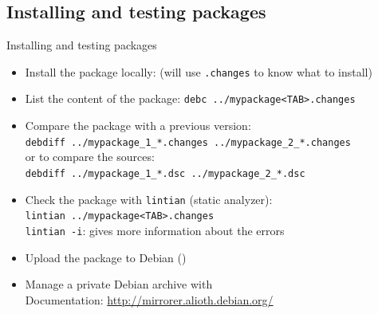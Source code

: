 \documentclass[10pt,final]{beamer}
\begin{document}
\subsection{Installing and testing packages}
\begin{frame}{Installing and testing packages}
\begin{itemize}
	\item Install the package locally:  (will use \texttt{.changes} to know what to install)
		\br
	\item List the content of the package: \texttt{{\color{rouge}debc} ../mypackage<TAB>.changes}
		\br
	\item Compare the package with a previous version:\\
		\texttt{{\color{rouge}debdiff} ../mypackage\_1\_*.changes ../mypackage\_2\_*.changes}\\
		or to compare the sources:\\
		\texttt{{\color{rouge}debdiff} ../mypackage\_1\_*.dsc ../mypackage\_2\_*.dsc}\\
		\br
	\item Check the package with \texttt{lintian} (static analyzer):\\
		\texttt{{\color{rouge}lintian} ../mypackage<TAB>.changes}\\
		\texttt{lintian -i}: gives more information about the errors
		\br
	\item Upload the package to Debian ()
		\br
	\item Manage a private Debian archive with \\
		Documentation: \url{http://mirrorer.alioth.debian.org/}

\end{itemize}
\end{frame}
\end{document}
